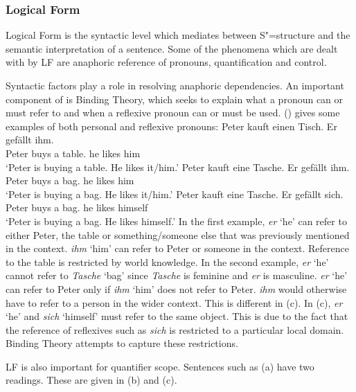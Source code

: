 \subsubsection{Logical Form}

Logical Form is the syntactic level which mediates between S"=structure and the semantic interpretation of
a sentence. Some of the phenomena which are dealt with by LF are anaphoric reference of pronouns, quantification and control. 

Syntactic factors\label{Seite-Bindungstheorie} play a role in resolving anaphoric dependencies.
An important component of \gbt is Binding Theory, which seeks to explain what a
pronoun can or must refer to and when a reflexive pronoun can or must be used. 
() gives some examples of both personal and reflexive pronouns:
\eal
\ex 
\gll Peter kauft einen Tisch. Er gefällt ihm.\\
	 Peter buys a table.\mas{} he likes him\\
\glt `Peter is buying a table. He likes it/him.'
\ex 
\gll Peter kauft eine Tasche. Er gefällt ihm.\\
	 Peter buys a bag.\fem{} he likes him\\
\glt `Peter is buying a bag. He likes it/him.'
\ex 
\gll Peter kauft eine Tasche. Er gefällt sich.\\
	 Peter buys a bag.\fem{} he likes himself\\
\glt `Peter is buying a bag. He likes himself.'
\zl
In the first example, \emph{er} `he' can refer to either Peter, the table or something/someone else that was previously mentioned
in the context. \emph{ihm} `him' can refer to Peter or someone in the context. Reference to the table is restricted by world knowledge.
In the second example, \emph{er} `he' cannot refer to \emph{Tasche} `bag' since \emph{Tasche} is feminine and \emph{er} is masculine.
\emph{er} `he' can refer to Peter only if \emph{ihm} `him' does not refer to Peter. \emph{ihm} would otherwise have to refer to a person
in the wider context. This is different in (c). In (c), \emph{er} `he' and \emph{sich} `himself' must refer to the same
object. This is due to the fact that the reference of reflexives such as \emph{sich} is restricted to a particular local domain. Binding Theory
attempts to capture these restrictions.

LF is also important for quantifier scope. Sentences such as (a) have two readings. These are given in (b) and (c).

